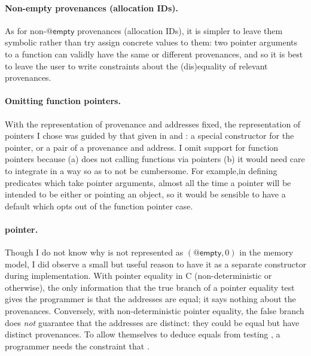 \paragraph{Non-empty provenances (allocation IDs).}%
As for non-$@\mathsf{empty}$ provenances (allocation IDs), it is simpler to
leave them symbolic rather than try assign concrete values to them: two pointer
arguments to a function can validly have the same or different provenances, and
so it is best to leave the user to write constraints about the (dis)equality of %
relevant provenances.

\paragraph{Omitting function pointers.}%
With the representation of provenance and addresses fixed, the representation
of pointers I chose was guided by that given in  and :
a special constructor for the  pointer, or a pair of a
provenance and address. I omit support for function pointers
because (a)  does not calling functions via pointers (b) it would need
care to integrate in a way so as to not be cumbersome. For example,in defining
predicates which take pointer arguments, almost all the time a pointer will be
intended to be either  or pointing an object, so it would be sensible to
have a default which opts out of the function pointer case.

\paragraph{ pointer.}%
Though I do not know why  is not represented as
$(@\mathsf{empty}, 0)$ in the memory model, I did observe a
small but useful reason to have it as a separate constructor during
implementation. With pointer equality in C (non-deterministic or otherwise),
the only information that the true branch of a pointer equality test gives the
programmer is that the addresses are equal; it says nothing about the
provenances. Conversely, with non-deterministic pointer equality, the false
branch does \emph{not} guarantee that the addresses are distinct: they could be
equal but have distinct provenances. To allow themselves to deduce 
equals  from testing , a programmer needs the
constraint that .%

